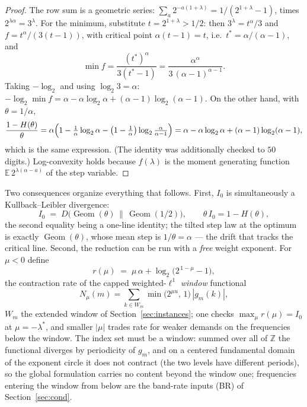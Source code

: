 \documentclass[11pt]{article}
\theoremstyle{definition}
\DeclareMathOperator{\Geom}{Geom}
\newcommand{\E}{\mathbb{E}}
\begin{document}
\begin{proof}
The row sum is a geometric series: $\sum_a 2^{-a(1+\lambda)}=1/(2^{1+\lambda}-1)$,
times $2^{\lambda\alpha}=3^{\lambda}$. For the minimum, substitute
$t=2^{1+\lambda}>1/2$: then $3^{\lambda}=t^{\alpha}/3$ and
$f=t^{\alpha}/(3(t-1))$, with critical point $\alpha(t-1)=t$, i.e.\
$t^*=\alpha/(\alpha-1)$, and
\[
\min f=\frac{(t^*)^{\alpha}}{3(t^*-1)}
=\frac{\alpha^{\alpha}}{3\,(\alpha-1)^{\alpha-1}} .
\]
Taking $-\log_2$ and using $\log_2 3=\alpha$:
$-\log_2\min f=\alpha-\alpha\log_2\alpha+(\alpha-1)\log_2(\alpha-1)$.
On the other hand, with $\theta=1/\alpha$,
\[
\frac{1-H(\theta)}{\theta}
=\alpha\Bigl(1-\tfrac1\alpha\log_2\alpha
-\bigl(1-\tfrac1\alpha\bigr)\log_2\tfrac{\alpha}{\alpha-1}\Bigr)
=\alpha-\alpha\log_2\alpha+(\alpha-1)\log_2(\alpha-1),
\]
which is the same expression. (The identity was additionally checked to
$50$ digits.) Log-convexity holds because $f(\lambda)$ is the moment
generating function $\E\,2^{\lambda(\alpha-a)}$ of the step variable.
\end{proof}

Two consequences organize everything that follows. First, $I_0$ is
simultaneously a Kullback--Leibler divergence:
\begin{equation}\label{eq:kl}
I_0\;=\;D\bigl(\Geom(\theta)\,\|\,\Geom(1/2)\bigr),\qquad
\theta\, I_0=1-H(\theta),
\end{equation}
the second equality being a one-line identity; the tilted step law at the
optimum is exactly $\Geom(\theta)$, whose mean step is $1/\theta=\alpha$
--- the drift that tracks the critical line. Second, the reduction can be
run with a \emph{free} weight exponent. For $\mu<0$ define
\begin{equation}\label{eq:rmu}
r(\mu)\;=\;\mu\,\alpha+\log_2\!\bigl(2^{\,1-\mu}-1\bigr),
\end{equation}
the contraction rate of the capped weighted-$\ell^1$ \emph{window}
functional
\[
N_{\mu}(m)=\sum_{k\in W_m}\min\bigl(2^{\mu u},\,1\bigr)\,|g_m(k)|,
\]
$W_m$ the extended window of Section~\ref{sec:instances}; one checks
$\max_{\mu}r(\mu)=I_0$ at $\mu=-\lambda^*$, and smaller $|\mu|$ trades
rate for weaker demands on the frequencies below the window. The index set
must be a window: summed over all of $\mathbb Z$ the functional diverges
by periodicity of $g_m$, and on a centered fundamental domain of the
exponent circle it does not contract (the two levels have different
periods), so the global formulation carries no content beyond the window
one; frequencies entering the window from below are the band-rate inputs
(BR) of Section~\ref{sec:cond}.
\end{document}
